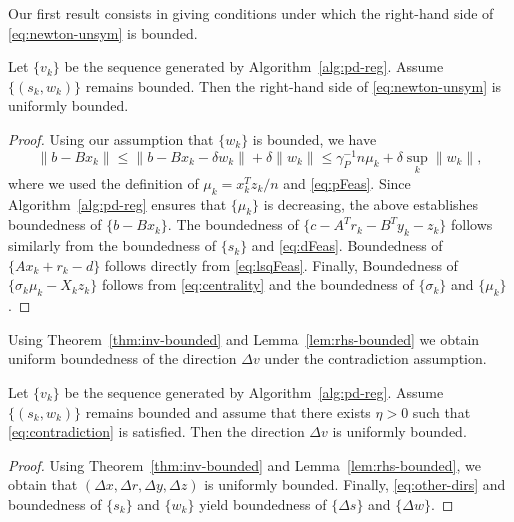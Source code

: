 \documentclass{amsart}
\begin{document}
Our first result consists in giving conditions under which the right-hand side
of \eqref{eq:newton-unsym} is bounded.

\begin{blemma}
  \label{lem:rhs-bounded}
  Let $\{v_k\}$ be the sequence generated by Algorithm~\ref{alg:pd-reg}. Assume
  $\{(s_k, w_k)\}$ remains bounded. Then the right-hand side of
  \eqref{eq:newton-unsym} is uniformly bounded.
\end{blemma}

\begin{proof}
  Using our assumption that $\{w_k\}$ is bounded, we have
  \[
    \|b - B x_k\| \leq
    \|b - Bx_k - \delta w_k\| + \delta \|w_k\| \leq
    \gamma_P^{-1} n \mu_k + \delta \sup_k \|w_k\|,
  \]
  where we used the definition of $\mu_k = x_k^T z_k / n$ and \eqref{eq:pFeas}.
  Since Algorithm~\ref{alg:pd-reg} ensures that $\{\mu_k\}$ is decreasing, the
  above establishes boundedness of $\{b - B x_k\}$. The boundedness of $\{c -
  A^T r_k - B^T y_k - z_k\}$ follows similarly from the boundedness of
  $\{s_k\}$ and \eqref{eq:dFeas}. Boundedness of $\{A x_k + r_k - d\}$ follows
  directly from \eqref{eq:lsqFeas}. Finally, Boundedness of $\{\sigma_k \mu_k -
  X_k z_k\}$ follows from \eqref{eq:centrality} and the boundedness of
  $\{\sigma_k\}$ and $\{\mu_k\}$.
\end{proof}

Using Theorem~\ref{thm:inv-bounded} and Lemma~\ref{lem:rhs-bounded}
we obtain uniform boundedness of the direction $\Delta v$ under the
contradiction assumption.

\begin{blemma}
  \label{lem:dir-bounded}
  Let $\{v_k\}$ be the sequence generated by Algorithm~\ref{alg:pd-reg}. Assume
  $\{(s_k, w_k)\}$ remains bounded and assume that there exists $\eta > 0$
  such that \eqref{eq:contradiction} is satisfied. Then the direction $\Delta
  v$ is uniformly bounded.
\end{blemma}

\begin{proof}
  Using Theorem~\ref{thm:inv-bounded} and Lemma~\ref{lem:rhs-bounded}, we obtain
  that $(\Delta x, \Delta r, \Delta y, \Delta z)$ is uniformly bounded.
  Finally, \eqref{eq:other-dirs}
  and boundedness of $\{s_k\}$ and $\{w_k\}$ yield boundedness of $\{\Delta
  s\}$ and $\{\Delta w\}$.
\end{proof}
\end{document}
